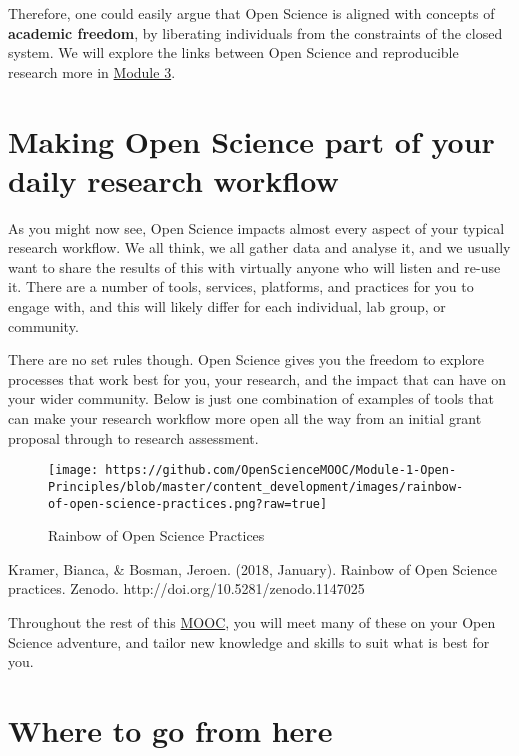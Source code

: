 \documentclass[]{book}
\begin{document}
Therefore, one could easily argue that Open Science is aligned with concepts of \textbf{academic freedom}, by liberating individuals from the constraints of the closed system. We will explore the links between Open Science and reproducible research more in \href{https://opensciencemooc.eu/modules/reproducible-research-and-data-analysis/}{Module 3}.

\hypertarget{making-open-science-part-of-your-daily-research-workflow}{%
\section{Making Open Science part of your daily research workflow }\label{making-open-science-part-of-your-daily-research-workflow}}

As you might now see, Open Science impacts almost every aspect of your typical research workflow. We all think, we all gather data and analyse it, and we usually want to share the results of this with virtually anyone who will listen and re-use it. There are a number of tools, services, platforms, and practices for you to engage with, and this will likely differ for each individual, lab group, or community.

There are no set rules though. Open Science gives you the freedom to explore processes that work best for you, your research, and the impact that can have on your wider community. Below is just one combination of examples of tools that can make your research workflow more open all the way from an initial grant proposal through to research assessment.

\begin{figure}
\centering
\texttt{[image: https://github.com/OpenScienceMOOC/Module-1-Open-Principles/blob/master/content\_development/images/rainbow-of-open-science-practices.png?raw=true]}
\caption{Rainbow of Open Science Practices}
\end{figure}

Kramer, Bianca, \& Bosman, Jeroen. (2018, January). Rainbow of Open Science practices. Zenodo. http://doi.org/10.5281/zenodo.1147025

Throughout the rest of this \href{https://opensciencemooc.eu/}{MOOC}, you will meet many of these on your Open Science adventure, and tailor new knowledge and skills to suit what is best for you.

\hypertarget{where-to-go-from-here}{%
\section{Where to go from here }\label{where-to-go-from-here}}
\end{document}
